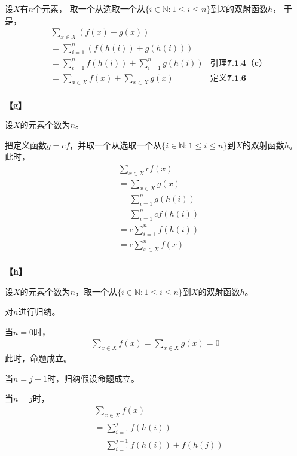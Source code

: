 \documentclass{article}
\theoremstyle{mystyle}
\begin{document}
设$X$有$n$个元素，
取一个从选取一个从$\{i \in \mathbb{N}: 1 \leq i \leq n\}$到$X$的双射函数$h$，
于是，
\begin{align*}
        & \sum \limits_{x \in X} (f(x) + g(x))                                                \\
        & = \sum \limits_{i=1}^n (f(h(i)) + g(h(i)))                                          \\
        & = \sum \limits_{i=1}^n f(h(i)) + \sum \limits_{i=1}^n g(h(i)) & \textbf{引理7.1.4（c）} \\
        & = \sum \limits_{x \in X} f(x) +\sum \limits_{x \in X} g(x)    & \textbf{定义7.1.6}    \\
\end{align*}

\textbf{【g】}

设$X$的元素个数为$n$。

把定义函数$g = cf$，并取一个从选取一个从$\{i \in \mathbb{N}: 1 \leq i \leq n\}$到$X$的双射函数$h$。
此时，
\begin{align*}
        & \sum \limits_{x \in X} cf(x)       \\
        & = \sum \limits_{x \in X} g(x)      \\
        & = \sum \limits_{i = 1}^n g(h(i))   \\
        & = \sum \limits_{i = 1}^n cf(h(i))  \\
        & = c \sum \limits_{i = 1}^n f(h(i)) \\
        & = c \sum \limits_{x \in X}^n f(x)  \\
\end{align*}

\textbf{【h】}

设$X$的元素个数为$n$，取一个从$\{i \in \mathbb{N}: 1 \leq i \leq n\}$到$X$的双射函数$h$。

对$n$进行归纳。

当$n = 0$时，
\begin{align*}
       \sum \limits_{x \in X} f(x) = \sum \limits_{x \in X} g(x) = 0
\end{align*}
此时，命题成立。

当$n=j-1$时，归纳假设命题成立。

当$n=j$时，
\begin{align*}
        & \sum \limits_{x \in X} f(x)                    \\
        & = \sum \limits_{i = 1}^j f(h(i))               \\
        & = \sum \limits_{i = 1}^{j-1} f(h(i)) + f(h(j)) \\
\end{align*}
\end{document}
